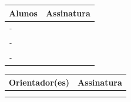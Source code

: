 \documentclass[
	hidelinks,
	12pt,				%
	openright,			%
	oneside,			%
	a4paper,			%
	english,			%
	french,				%
	spanish,			%
	brazil,				%
]{abntex2}
\newcommand{\imprimirorient}{\oorient}
\newcommand{\imprimircoorient}{\ocoorient}
\newcommand{\imprimirautorA}{\oautorA}
\newcommand{\imprimirprontuarioA}{\oprontuarioA}
\newcommand{\imprimirautorB}{\oautorB}
\newcommand{\imprimirprontuarioB}{\oprontuarioB}
\newcommand{\imprimirautorC}{\oautorC}
\newcommand{\imprimirprontuarioC}{\oprontuarioC}
\begin{document}
\begin{center}
	\begin{tabular}{|m{10cm}|m{5cm}|}
		\hline
		\textbf{Alunos} & \textbf{Assinatura} \\
		\hline
		 \textit{\imprimirprontuarioA - \imprimirautorA} &  \\
		\hline
		\textit{\imprimirprontuarioB - \imprimirautorB} &  \\
		\hline
		\textit{\imprimirprontuarioC - \imprimirautorC} & \\
		\hline
	\end{tabular}
\end{center}

\vspace{0.5cm}

\begin{center}
	\begin{tabular}{|m{10cm}|m{5cm}|}
		\hline
		\textbf{Orientador(es)} & \textbf{Assinatura} \\
		\hline
		\textit{\imprimirorient} & \\
		\hline
		\textit{\imprimircoorient} & \\
		\hline
	\end{tabular}
\end{center}



\end{document}
